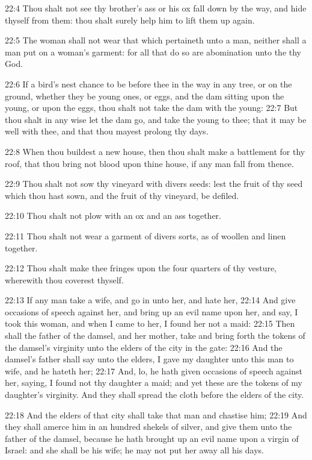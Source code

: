 22:4 Thou shalt not see thy brother's ass or his ox fall down by the
way, and hide thyself from them: thou shalt surely help him to lift
them up again.

22:5 The woman shall not wear that which pertaineth unto a man,
neither shall a man put on a woman's garment: for all that do so are
abomination unto the \LORD thy God.

22:6 If a bird's nest chance to be before thee in the way in any tree,
or on the ground, whether they be young ones, or eggs, and the dam
sitting upon the young, or upon the eggs, thou shalt not take the dam
with the young: 22:7 But thou shalt in any wise let the dam go, and
take the young to thee; that it may be well with thee, and that thou
mayest prolong thy days.

22:8 When thou buildest a new house, then thou shalt make a battlement
for thy roof, that thou bring not blood upon thine house, if any man
fall from thence.

22:9 Thou shalt not sow thy vineyard with divers seeds: lest the fruit
of thy seed which thou hast sown, and the fruit of thy vineyard, be
defiled.

22:10 Thou shalt not plow with an ox and an ass together.

22:11 Thou shalt not wear a garment of divers sorts, as of woollen and
linen together.

22:12 Thou shalt make thee fringes upon the four quarters of thy
vesture, wherewith thou coverest thyself.

22:13 If any man take a wife, and go in unto her, and hate her, 22:14
And give occasions of speech against her, and bring up an evil name
upon her, and say, I took this woman, and when I came to her, I found
her not a maid: 22:15 Then shall the father of the damsel, and her
mother, take and bring forth the tokens of the damsel's virginity unto
the elders of the city in the gate: 22:16 And the damsel's father
shall say unto the elders, I gave my daughter unto this man to wife,
and he hateth her; 22:17 And, lo, he hath given occasions of speech
against her, saying, I found not thy daughter a maid; and yet these
are the tokens of my daughter's virginity. And they shall spread the
cloth before the elders of the city.

22:18 And the elders of that city shall take that man and chastise
him; 22:19 And they shall amerce him in an hundred shekels of silver,
and give them unto the father of the damsel, because he hath brought
up an evil name upon a virgin of Israel: and she shall be his wife; he
may not put her away all his days.

